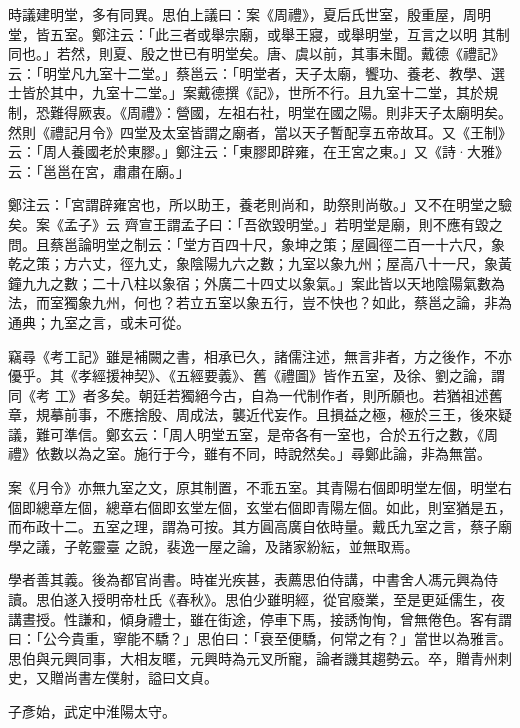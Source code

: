 \begin{pinyinscope}
 時議建明堂，多有同異。思伯上議曰：案《周禮》，夏后氏世室，殷重屋，周明堂，皆五室。鄭注云：「此三者或舉宗廟，或舉王寢，或舉明堂，互言之以明
 其制同也。」若然，則夏、殷之世已有明堂矣。唐、虞以前，其事未聞。戴德《禮記》云：「明堂凡九室十二堂。」蔡邕云：「明堂者，天子太廟，饗功、養老、教學、選士皆於其中，九室十二堂。」案戴德撰《記》，世所不行。且九室十二堂，其於規制，恐難得厥衷。《周禮》：營國，左祖右社，明堂在國之陽。則非天子太廟明矣。然則《禮記月令》四堂及太室皆謂之廟者，當以天子暫配享五帝故耳。又《王制》云：「周人養國老於東膠。」鄭注云：「東膠即辟雍，在王宮之東。」又《詩·大雅》云：「邕邕在宮，肅肅在廟。」



 鄭注云：「宮謂辟雍宮也，所以助王，養老則尚和，助祭則尚敬。」又不在明堂之驗矣。案《孟子》云
 齊宣王謂孟子曰：「吾欲毀明堂。」若明堂是廟，則不應有毀之問。且蔡邕論明堂之制云：「堂方百四十尺，象坤之策；屋圓徑二百一十六尺，象乾之策；方六丈，徑九丈，象陰陽九六之數；九室以象九州；屋高八十一尺，象黃鐘九九之數；二十八柱以象宿；外廣二十四丈以象氣。」案此皆以天地陰陽氣數為法，而室獨象九州，何也？若立五室以象五行，豈不快也？如此，蔡邕之論，非為通典；九室之言，或未可從。



 竊尋《考工記》雖是補闕之書，相承已久，諸儒注述，無言非者，方之後作，不亦優乎。其《孝經援神契》、《五經要義》、舊《禮圖》皆作五室，及徐、劉之論，謂同《考
 工》者多矣。朝廷若獨絕今古，自為一代制作者，則所願也。若猶祖述舊章，規摹前事，不應捨殷、周成法，襲近代妄作。且損益之極，極於三王，後來疑議，難可準信。鄭玄云：「周人明堂五室，是帝各有一室也，合於五行之數，《周禮》依數以為之室。施行于今，雖有不同，時說然矣。」尋鄭此論，非為無當。



 案《月令》亦無九室之文，原其制置，不乖五室。其青陽右個即明堂左個，明堂右個即總章左個，總章右個即玄堂左個，玄堂右個即青陽左個。如此，則室猶是五，而布政十二。五室之理，謂為可按。其方圓高廣自依時量。戴氏九室之言，蔡子廟學之議，子乾靈臺
 之說，裴逸一屋之論，及諸家紛紜，並無取焉。



 學者善其義。後為都官尚書。時崔光疾甚，表薦思伯侍講，中書舍人馮元興為侍讀。思伯遂入授明帝杜氏《春秋》。思伯少雖明經，從官廢業，至是更延儒生，夜講晝授。性謙和，傾身禮士，雖在街途，停車下馬，接誘恂恂，曾無倦色。客有謂曰：「公今貴重，寧能不驕？」思伯曰：「衰至便驕，何常之有？」當世以為雅言。思伯與元興同事，大相友暱，元興時為元叉所寵，論者譏其趨勢云。卒，贈青州刺史，又贈尚書左僕射，謚曰文貞。



 子彥始，武定中淮陽太守。




\end{pinyinscope}
